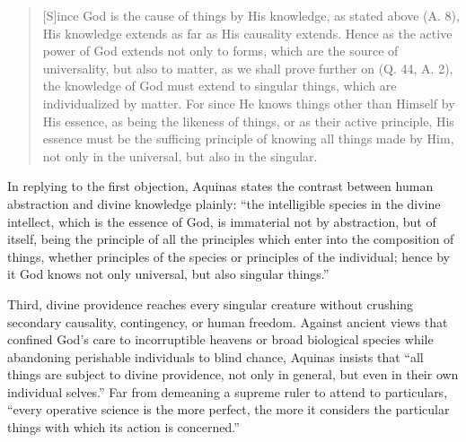 \begin{quote}
[S]ince God is the cause of things by His knowledge, as stated above (A. 8), His knowledge extends as far as His causality extends. Hence as the active power of God extends not only to forms, which are the source of universality, but also to matter, as we shall prove further on (Q. 44, A. 2), the knowledge of God must extend to singular things, which are individualized by matter. For since He knows things other than Himself by His essence, as being the likeness of things, or as their active principle, His essence must be the sufficing principle of knowing all things made by Him, not only in the universal, but also in the singular.
\end{quote}

In replying to the first objection, Aquinas states the contrast between human abstraction and divine knowledge plainly: ``the intelligible species in the divine intellect, which is the essence of God, is immaterial not by abstraction, but of itself, being the principle of all the principles which enter into the composition of things, whether principles of the species or principles of the individual; hence by it God knows not only universal, but also singular things.''

Third, divine providence reaches every singular creature without crushing secondary causality, contingency, or human freedom. Against ancient views that confined God's care to incorruptible heavens or broad biological species while abandoning perishable individuals to blind chance, Aquinas insists that ``all things are subject to divine providence, not only in general, but even in their own individual selves.'' Far from demeaning a supreme ruler to attend to particulars, ``every operative science is the more perfect, the more it considers the particular things with which its action is concerned.''


